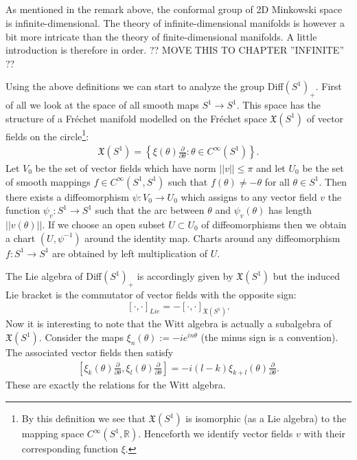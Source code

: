 \subsection{}

    As mentioned in the remark above, the conformal group of 2D Minkowski space is infinite-dimensional. The theory of infinite-dimensional manifolds is however a bit more intricate than the theory of finite-dimensional manifolds. A little introduction is therefore in order. ?? MOVE THIS TO CHAPTER ''INFINITE'' ??


    Using the above definitions we can start to analyze the group Diff$(S^1)_+$. First of all we look at the space of all smooth maps $S^1\rightarrow S^1$. This space has the structure of a Fr\'echet manifold modelled on the Fr\'echet space $\mathfrak{X}(S^1)$ of vector fields on the circle\footnote{By this definition we see that $\mathfrak{X}(S^1)$ is isomorphic (as a Lie algebra) to the mapping space $C^\infty(S^1, \mathbb{R})$. Henceforth we identify vector fields $v$ with their corresponding function $\xi$.}:
    \begin{gather}
        \mathfrak{X}(S^1) = \left\{\xi(\theta)\frac{\partial}{\partial\theta}:\theta\in C^\infty(S^1)\right\}.
    \end{gather}
    Let $V_0$ be the set of vector fields which have norm $||v||\leq\pi$ and let $U_0$ be the set of smooth mappings $f\in C^\infty(S^1, S^1)$ such that $f(\theta)\neq-\theta$ for all $\theta\in S^1$. Then there exists a diffeomorphism $\psi:V_0\rightarrow U_0$ which assigns to any vector field $v$ the function $\psi_v:S^1\rightarrow S^1$ such that the arc between $\theta$ and $\psi_v(\theta)$ has length $||v(\theta)||$. If we choose an open subset $U\subset U_0$ of diffeomorphisms then we obtain a chart $(U, \psi^{-1})$ around the identity map. Charts around any diffeomorphism $f:S^1\rightarrow S^1$ are obtained by left multiplication of $U$.

    The Lie algebra of Diff$(S^1)_+$ is accordingly given by $\mathfrak{X}(S^1)$ but the induced Lie bracket is the commutator of vector fields with the opposite sign: \[[\cdot, \cdot]_{Lie} = -[\cdot, \cdot]_{\mathfrak{X}(S^1)}.\] Now it is interesting to note that the Witt algebra is actually a subalgebra of $\mathfrak{X}(S^1)$. Consider the maps $\xi_n(\theta):=-ie^{in\theta}$ (the minus sign is a convention). The associated vector fields then satisfy
    \begin{gather}
        \left[\xi_k(\theta)\frac{\partial}{\partial\theta}, \xi_l(\theta)\frac{\partial}{\partial\theta}\right] = -i(l-k)\xi_{k+l}(\theta)\frac{\partial}{\partial\theta}.
    \end{gather}
    These are exactly the relations for the Witt algebra.

